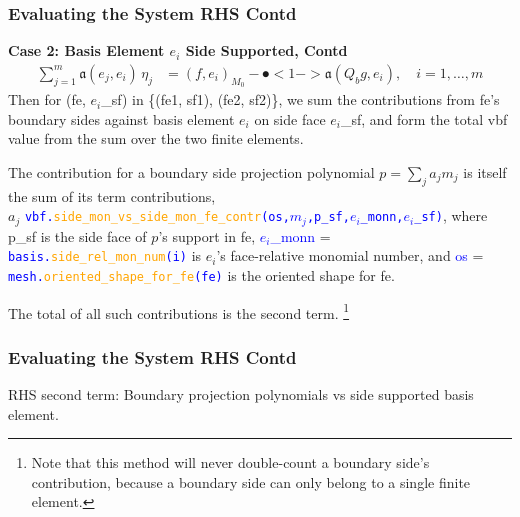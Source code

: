 \documentclass[compress]{beamer}
\begin{document}
\begin{frame}
  \frametitle{Evaluating the System RHS Contd}
  \textbf{Case 2: Basis Element $e_i$ Side Supported, Contd}
  \vspace{-.15cm}
  \begin{align*}
    \sum_{j=1}^m{\mathfrak{a}(e_j, e_i) \,\eta_j} &= (f, e_i)_{M_0} - \spot<1->{\mathfrak{a}(Q_b g, e_i)}, \quad i=1,\dots,m
  \end{align*}
  Then for (fe, $e_i$\_sf) in \{(fe1, sf1), (fe2, sf2)\},
  we sum the contributions from fe's boundary sides against basis element $e_i$ on side face $e_i$\_sf, and form the total
  vbf value from the sum over the two finite elements.
  
  The contribution for a boundary side projection polynomial $p=\sum_j a_j m_j$ is itself the sum of its term contributions,\\ 
  $a_j$ {\small \texttt{\textcolor{blue}{vbf.\textcolor{orange}{side\_mon\_vs\_side\_mon\_fe\_contr}(os,$m_j$,p\_sf,$e_i$\_monn,$e_i$\_sf)}}},
  where p\_sf is the side face of $p$'s support in fe, 
  \textcolor{blue}{\small $e_i$\_monn} = {\small \texttt{\textcolor{blue}{basis.\textcolor{orange}{side\_rel\_mon\_num}(i)}}} is
  $e_i$'s face-relative monomial number, and 
  \textcolor{blue}{\small os} = {\small \texttt{\textcolor{blue}{mesh.\textcolor{orange}{oriented\_shape\_for\_fe}(fe)}}} is the 
  oriented shape for fe.

  The total of all such contributions is the second term.
  \footnote{Note that this method will never double-count a boundary side's contribution, because a boundary side can only belong
   to a single finite element.}

\end{frame}

\begin{frame}
  \frametitle{Evaluating the System RHS Contd}
  {\scriptsize RHS second term: Boundary projection polynomials vs side supported basis element.}
\end{frame}
\end{document}
